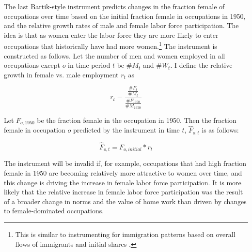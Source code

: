 \documentclass[12pt]{article}
\begin{document}


The last Bartik-style instrument predicts changes in the fraction female of occupations over time based on the initial fraction female in occupations in 1950, and the relative growth rates of male and female labor force participation. The idea is that as women enter the labor force they are more likely to enter occupations that historically have had more women.\footnote{This is similar to instrumenting for immigration patterns based on overall flows of immigrants and initial shares \cite{Altonji1991a}.} The instrument is constructed as follows. Let the number of men and women employed in all occupations except $o$ in time period $t$ be $\#M_t$ and $\#W_t$. I define the relative growth in female vs. male employment $r_t$ as

$$ r_t = \frac{ \frac{\#F_t}{\#M_t} }{ \frac{\#F_{1950}}{\#M_{1950}} }$$

Let $F_{o,1950}$ be the fraction female in the occupation in 1950. Then the fraction female in occupation $o$ predicted by the instrument in time $t$, $\hat{F}_{o,t}$ is as follows:

$$\hat{F}_{o,t} = F_{o,initial} * r_t $$

The instrument will be invalid if, for example, occupations that had high fraction female in 1950 are becoming relatively more attractive to women over time, and this change is driving the increase in female labor force participation. It is more likely that the relative increase in female labor force participation was the result of a broader change in norms and the value of home work than driven by changes to female-dominated occupations.
 
\end{document}
